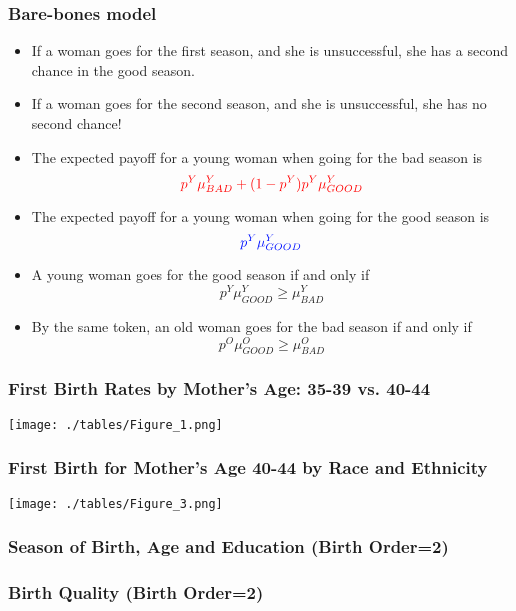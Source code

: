 \documentclass[10pt,letterpaper,subeqn]{beamer}
\begin{document}
\begin{frame}[label=model]
\frametitle{Bare-bones model}

\begin{itemize}
\item If a woman goes for the first season, and she is unsuccessful, she has a second chance in the good season.
\item If a woman goes for the second season, and she is unsuccessful, she has no second chance!
\item The expected payoff for a young woman when going for the \textcolor[rgb]{1.00,0.00,0.00}{bad season} is
    $$\displaystyle \textcolor[rgb]{1.00,0.00,0.00}{p^Y\mu_{BAD}^Y + (1-p^Y)p^Y\mu_{GOOD}^Y}   $$
\item The expected payoff for a young woman when going for the \textcolor[rgb]{0.00,0.07,1.00}{good season} is
    $$\displaystyle \textcolor[rgb]{0.00,0.07,1.00}{p^Y\mu_{GOOD}^Y} $$
\item A young woman goes for the good season if and only if
    $$\displaystyle p^Y\mu_{GOOD}^Y \geq \mu_{BAD}^Y $$
\item By the same token, an old woman goes for the bad season if and only if
    $$\displaystyle p^O\mu_{GOOD}^O \geq \mu_{BAD}^O $$
\end{itemize}
\end{frame}


\begin{frame}
\frametitle{First Birth Rates by Mother's Age: 35-39 vs. 40-44}
\begin{center}
\texttt{[image: ./tables/Figure\_1.png]}
\end{center}
\end{frame}

\begin{frame}
\frametitle{First Birth for Mother's Age 40-44 by Race and Ethnicity}
\begin{center}
\texttt{[image: ./tables/Figure\_3.png]}
\end{center}
\end{frame}

\begin{frame}[label=NVSSseason2]
\frametitle{Season of Birth, Age and Education (Birth Order=2)}

\end{frame}

\begin{frame}[label=NVSSQuality2]
\frametitle{Birth Quality (Birth Order=2)}

\end{frame}
\end{document}
